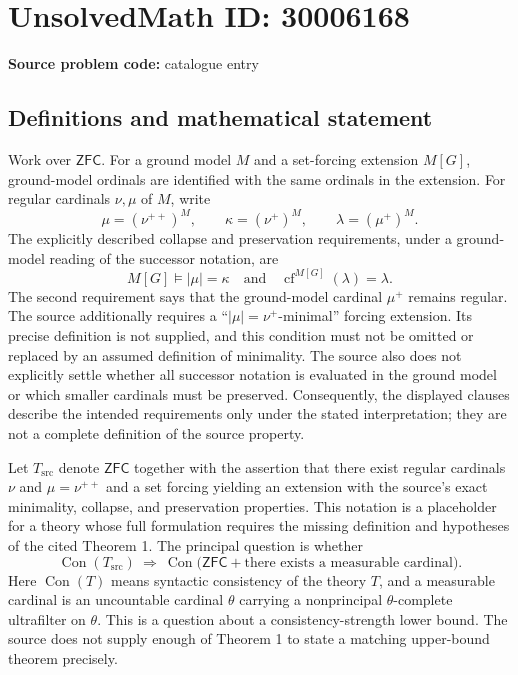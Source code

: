 \documentclass[11pt]{article}
\begin{document}
\section*{UnsolvedMath ID: 30006168}
\textbf{Source problem code:} catalogue entry
\subsection{Definitions and mathematical statement}
Work over \(\mathsf{ZFC}\). For a ground model \(M\) and a set-forcing extension \(M[G]\), ground-model ordinals are identified with the same ordinals in the extension. For regular cardinals \(\nu,\mu\) of \(M\), write
\[
\mu=(\nu^{++})^M,\qquad \kappa=(\nu^+)^M,\qquad \lambda=(\mu^+)^M.
\]
The explicitly described collapse and preservation requirements, under a ground-model reading of the successor notation, are
\[
M[G]\models |\mu|=\kappa
\quad\text{and}\quad
\operatorname{cf}^{M[G]}(\lambda)=\lambda.
\]
The second requirement says that the ground-model cardinal \(\mu^+\) remains regular. The source additionally requires a ``\(|\mu|=\nu^+\)-minimal'' forcing extension. Its precise definition is not supplied, and this condition must not be omitted or replaced by an assumed definition of minimality. The source also does not explicitly settle whether all successor notation is evaluated in the ground model or which smaller cardinals must be preserved. Consequently, the displayed clauses describe the intended requirements only under the stated interpretation; they are not a complete definition of the source property.

Let \(T_{\mathrm{src}}\) denote \(\mathsf{ZFC}\) together with the assertion that there exist regular cardinals \(\nu\) and \(\mu=\nu^{++}\) and a set forcing yielding an extension with the source's exact minimality, collapse, and preservation properties. This notation is a placeholder for a theory whose full formulation requires the missing definition and hypotheses of the cited Theorem 1. The principal question is whether
\[
\operatorname{Con}(T_{\mathrm{src}})
\ \Longrightarrow\
\operatorname{Con}\bigl(\mathsf{ZFC}+\text{there exists a measurable cardinal}\bigr).
\]
Here \(\operatorname{Con}(T)\) means syntactic consistency of the theory \(T\), and a measurable cardinal is an uncountable cardinal \(\theta\) carrying a nonprincipal \(\theta\)-complete ultrafilter on \(\theta\). This is a question about a consistency-strength lower bound. The source does not supply enough of Theorem 1 to state a matching upper-bound theorem precisely.
\end{document}
